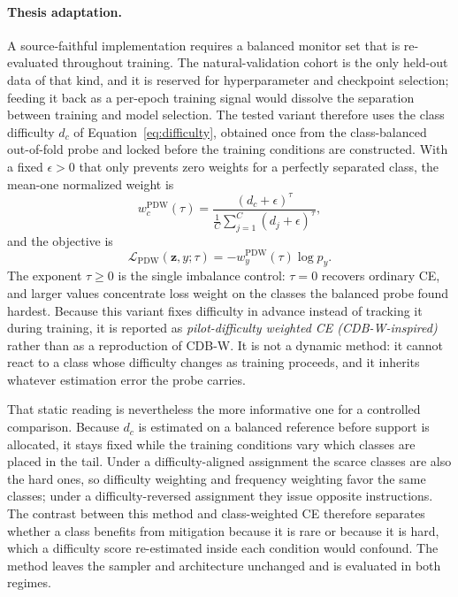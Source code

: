 \documentclass[11pt]{article}
\begin{document}
\paragraph{Thesis adaptation.}
A source-faithful implementation requires a balanced monitor set that is re-evaluated throughout training. The natural-validation cohort is the only held-out data of that kind, and it is reserved for hyperparameter and checkpoint selection; feeding it back as a per-epoch training signal would dissolve the separation between training and model selection. The tested variant therefore uses the class difficulty $d_c$ of Equation~\eqref{eq:difficulty}, obtained once from the class-balanced out-of-fold probe and locked before the training conditions are constructed. With a fixed $\epsilon>0$ that only prevents zero weights for a perfectly separated class, the mean-one normalized weight is
\begin{equation}
  w_c^{\mathrm{PDW}}(\tau)=
  \frac{(d_c+\epsilon)^{\tau}}
       {\frac{1}{C}\sum_{j=1}^{C}(d_j+\epsilon)^{\tau}},
  \label{eq:pdw-weight}
\end{equation}
\noindent and the objective is
\begin{equation}
  \mathcal{L}_{\mathrm{PDW}}(\mathbf z,y;\tau)=-w_y^{\mathrm{PDW}}(\tau)\log p_y.
  \label{eq:pdw-ce}
\end{equation}
\noindent The exponent $\tau\geq0$ is the single imbalance control: $\tau=0$ recovers ordinary CE, and larger values concentrate loss weight on the classes the balanced probe found hardest. Because this variant fixes difficulty in advance instead of tracking it during training, it is reported as \emph{pilot-difficulty weighted CE (CDB-W-inspired)} rather than as a reproduction of CDB-W. It is not a dynamic method: it cannot react to a class whose difficulty changes as training proceeds, and it inherits whatever estimation error the probe carries.

That static reading is nevertheless the more informative one for a controlled comparison. Because $d_c$ is estimated on a balanced reference before support is allocated, it stays fixed while the training conditions vary which classes are placed in the tail. Under a difficulty-aligned assignment the scarce classes are also the hard ones, so difficulty weighting and frequency weighting favor the same classes; under a difficulty-reversed assignment they issue opposite instructions. The contrast between this method and class-weighted CE therefore separates whether a class benefits from mitigation because it is rare or because it is hard, which a difficulty score re-estimated inside each condition would confound. The method leaves the sampler and architecture unchanged and is evaluated in both regimes.
\end{document}
